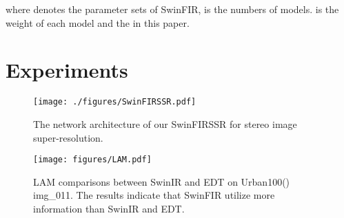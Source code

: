 \documentclass[10pt,twocolumn,letterpaper]{article}
\begin{document}
where  denotes the parameter sets of SwinFIR,  is the numbers of models.  is the weight of each model and the  in this paper. 
 \section{Experiments}


\begin{figure*}[t]
	\centering
	\texttt{[image: ./figures/SwinFIRSSR.pdf]}
	\caption{\small
		The network architecture of our SwinFIRSSR for stereo image super-resolution.
	}
	\label{fig:SwinFIRSSR}
\end{figure*}


\begin{figure}[htb]
	\centering
	\texttt{[image: figures/LAM.pdf]}
	\caption{LAM comparisons between SwinIR and EDT on Urban100() img\_011. The results indicate that SwinFIR utilize more information than SwinIR and EDT.} 
	\label{fig:LAM}
\end{figure}
\end{document}
